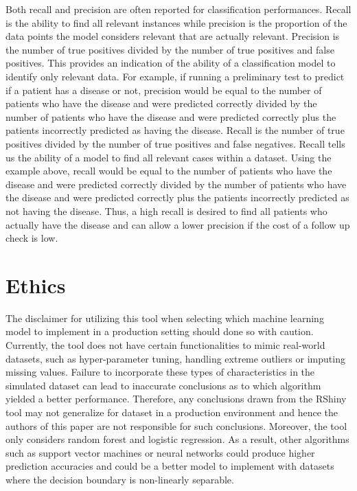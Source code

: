 \documentclass{llncs}
\begin{document}
Both recall and precision are often reported for classification performances.  Recall is the ability to find all relevant instances while precision is the proportion of the data points the model considers relevant that are actually relevant.  Precision is the number of true positives divided by the number of true positives and false positives.  This provides an indication of the ability of a classification model to identify only relevant data.  For example, if running a preliminary test to predict if a patient has a disease or not, precision would be equal to the number of patients who have the disease and were predicted correctly divided by the number of patients who have the disease and were predicted correctly plus the patients incorrectly predicted as having the disease.  Recall is the number of true positives divided by the number of true positives and false negatives. Recall tells us the ability of a model to find all relevant cases within a dataset.  Using the example above, recall would be equal to the number of patients who have the disease and were predicted correctly divided by the number of patients who have the disease and were predicted correctly plus the patients incorrectly predicted as not having the disease. Thus, a high recall is desired to find all patients who actually have the disease and can allow a lower precision if the cost of a follow up check is low.


\section{Ethics}

The disclaimer for utilizing this tool when selecting which machine learning model to implement in a production setting should done so with caution. Currently, the tool does not have certain functionalities to mimic real-world datasets, such as hyper-parameter tuning, handling extreme outliers or imputing missing values. Failure to incorporate these types of characteristics in the simulated dataset can lead to inaccurate conclusions as to which algorithm yielded a better performance. Therefore, any conclusions drawn from the RShiny tool may not generalize for dataset in a production environment and hence the authors of this paper are not responsible for such conclusions. Moreover, the tool only considers random forest and logistic regression. As a result, other algorithms such as support vector machines or neural networks could produce higher prediction accuracies and could be a better model to implement with datasets where the decision boundary is non-linearly separable. 
\end{document}
